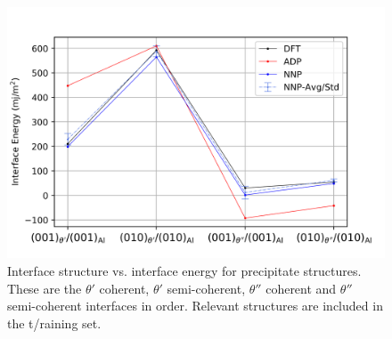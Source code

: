 \documentclass{article}
\begin{document}
\begin{figure}[H]%
\centering%
\includegraphics[width=1.2\textwidth,center]{./figures/interface_energies.png}%
\caption{Interface structure vs. interface energy for precipitate structures. 
These are the $\theta'$ coherent, $\theta'$ semi-coherent, $\theta''$ coherent and $\theta''$ semi-coherent
interfaces in order. Relevant structures are included in the t/raining set.}%
\label{fig:interface_energies}
\end{figure}
\end{document}
